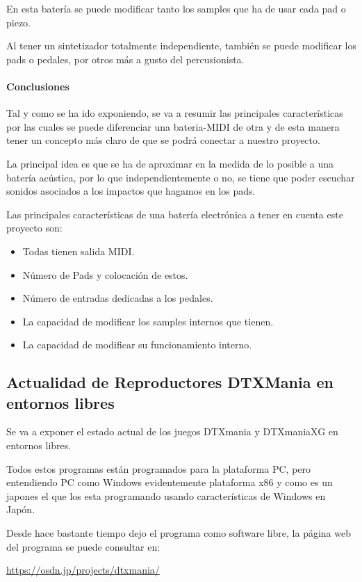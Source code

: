 \documentclass[a4paper,11pt,oneside]{book}
\begin{document}
En esta batería se puede modificar tanto los samples que ha de usar cada pad o piezo.

Al tener un sintetizador totalmente independiente, también se puede modificar los pads o pedales, por otros más a gusto del percusionista.
 
\paragraph{Conclusiones}
Tal y como se ha ido exponiendo, se va a resumir las principales características por las cuales se puede diferenciar una bateria-MIDI de otra y de esta manera tener un concepto más claro de que se podrá conectar a nuestro proyecto.

La principal idea es que se ha de aproximar en la medida de lo posible a una batería acústica, por lo que independientemente o no, se tiene que poder escuchar sonidos asociados a los impactos que hagamos en los pads.

Las principales características de una batería electrónica a tener en cuenta este proyecto son:
\begin{itemize}
  \item Todas tienen salida MIDI.
  \item Número de \gls{Pads} y colocación de estos.
  \item Número de entradas dedicadas a los pedales.
  \item La capacidad de modificar los samples internos que tienen.
  \item La capacidad de modificar su funcionamiento interno.
\end{itemize}

\subsection{Actualidad de Reproductores DTXMania en entornos libres}

Se va a exponer el estado actual de los juegos DTXmania y DTXmaniaXG en entornos libres.

Todos estos programas están programados para la plataforma PC, pero entendiendo PC como Windows evidentemente plataforma x86 y como es un japones el que los esta programando usando características de Windows en Japón.

Desde hace bastante tiempo dejo el programa como software libre, la página web del programa se puede consultar en:

\url{https://osdn.jp/projects/dtxmania/} 
\end{document}
